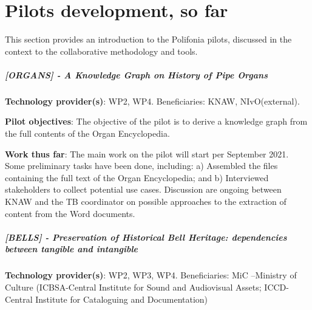 \chapter{Pilots development, so far}\label{ch:pilot}
This section provides an introduction to the Polifonia pilots, discussed in the context to the collaborative methodology and tools.

\paragraph*{[ORGANS] - A Knowledge Graph on History of Pipe Organs}\label{sec:pilot:organs}
\textbf{Technology provider(s)}: WP2, WP4. Beneficiaries: KNAW, NIvO(external).

\textbf{Pilot objectives}:
The objective of the pilot is to derive a knowledge graph from the full contents of the Organ Encyclopedia.

\textbf{Work thus far}: The main work on the pilot will start per September 2021. Some preliminary tasks have been done, including: a) Assembled the files containing the full text of the Organ Encyclopedia; and b) Interviewed stakeholders to collect potential use cases.
Discussion are ongoing between KNAW and the TB coordinator on possible approaches to the extraction of content from the Word documents.

\paragraph*{[BELLS] - Preservation of Historical Bell Heritage: dependencies between tangible and intangible}\label{sec:pilot:bells}

\textbf{Technology provider(s)}: WP2, WP3, WP4. Beneficiaries: MiC –Ministry of Culture (ICBSA-Central Institute for Sound and Audiovisual Assets; ICCD-Central Institute for Cataloguing and Documentation)

